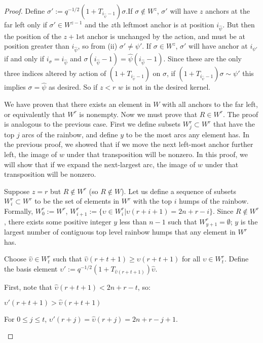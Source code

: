 \documentclass{amsart}
\begin{document}
\begin{proof}
	Define $\sigma':=q^{-1/2}(1+T_{i_{\widehat{\psi}}-1})\sigma$.If $\sigma\not\in W^z$, $\sigma'$ will have $z$ anchors at the far left only if $\sigma'\in W^{z-1}$ and the $z$th leftmost anchor is at position $i_{\widehat{\psi}}$. But then the position of the $z+1$st anchor is unchanged by the action, and must be at position greater than $i_{\widehat{\psi}}$, so from (ii) $\sigma'\not=\psi'$. If $\sigma\in W^z$, $\sigma'$ will have anchor at $i_{\psi'}$ if and only if $i_\sigma=i_{\widehat{\psi}}$ and $\sigma(i_{\widehat{\psi}}-1)=\widehat{\psi}(i_{\widehat{\psi}}-1)$. Since these are the only three indices altered by action of $(1+T_{i_{\widehat{\psi}}-1})$ on $\sigma$, if $(1+T_{i_{\widehat{\psi}}-1})\sigma\sim \psi'$ this implies $\sigma=\widehat{\psi}$ as desired. So if $z<r$ $w$ is not in the desired kernel.
	
	\vspace{1mm}
	We have proven that there exists an element in $W$ with all anchors to the far left, or equivalently that $W^r$ is nonempty. Now we must prove that $R\in W^r$. The proof is analogous to the previous case. First we define subsets $W^r_j\subset W^r$ that have the top $j$ arcs of the rainbow, and define $y$ to be the most arcs any element has. In the previous proof, we showed that if we move the next left-most anchor further left, the image of $w$ under that transposition will be nonzero. In this proof, we will show that if we expand the next-largest arc, the image of $w$ under that transposition will be nonzero.
	
	\vspace{1mm}
	Suppose $z=r$ but $R\not\in W^r$ (so $R\not\in W$). Let us define a sequence of subsets $W^r_i\subset W^r$ to be the set of elements in $W^r$ with the top $i$ humps of the rainbow. Formally, $W^r_0:=W^r$, $W^r_{i+1}:=\{\upsilon\in W^r_i| \upsilon(r+i+1)=2n+r-i \}$. Since $R\not\in W^r$,  there exists some positive integer $y$ less than $n-1$ such that $W^r_{y+1}=\emptyset$; $y$ is the largest number of contiguous top level rainbow humps that any element in $W^r$ has. 
	
	
	Choose $\widehat{\upsilon}\in W^r_t$ such that $\widehat{\upsilon}(r+t+1)\geq \upsilon(r+t+1)$ for all $\upsilon\in W^r_t$. Define the basis element $\upsilon':=q^{-1/2}(1+T_{\widehat{\upsilon}(r+t+1)})\widehat{\upsilon}$. 
	
	First, note that $\widehat{\upsilon}(r+t+1)<2n+r-t$, so:
	\begin{enumerate}[label={[\roman*]}]
		\item $\upsilon'(r+t+1)>\widehat{\upsilon}(r+t+1)$ 
		\item For $0\leq j\leq t$, $\upsilon'(r+j)=\widehat{\upsilon}(r+j)=2n+r-j+1$.
	\end{enumerate}
	

\end{proof}
\end{document}
